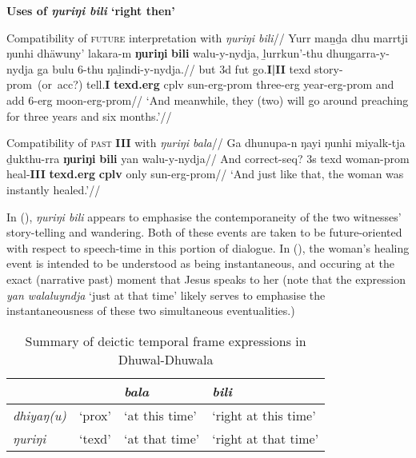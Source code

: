\pex{}\textbf{Uses of \textit{ŋuriŋi bili} `right then'}


\a{}\begingl\glpreamble Compatibility of \textsc{future} interpretation with \textit{ŋuriŋi bili}//
\gla Yurr maṉḏa dhu marrtji ŋunhi dhäwuny' lakara-m \textbf{ŋuriŋi} \textbf{bili} walu-y-nydja, ḻurrkun'-thu dhuŋgarra-y-nydja ga bulu 6-thu ŋaḻindi-y-nydja.//
\glb but 3d \gls{fut} go.\textbf{I|II} \gls{texd} story-\gls{prom}~(or~acc?) tell.\textbf{I} \textbf{\gls{texd}.\gls{erg}} \gls{cplv} sun-\gls{erg}-\gls{prom} three-\gls{erg} year-\gls{erg}-\gls{prom} and \gls{add} 6-\gls{erg} moon-\gls{erg}-\gls{prom}//
\glft`And meanwhile, they (two) will go around preaching for three years and six months.'//\endgl


\a{}\begingl\glpreamble Compatibility of \textsc{past} \textbf{III} with \textit{ŋuriŋi bala}//
\gla Ga dhunupa-n ŋayi ŋunhi miyalk-tja ḏukthu-rra \textbf{ŋuriŋi} \textbf{bili} yan walu-y-nydja//
\glb And correct-\gls{seq}? 3s \gls{texd} woman-\gls{prom} heal-\textbf{III} \textbf{\gls{texd}.\gls{erg}} \textbf{\gls{cplv}} only sun-\gls{erg}-\gls{prom}//
\glft`And just like that, the woman was instantly healed.'//\endgl

\xe



In (), \textit{ŋuriŋi bili} appears to emphasise the contemporaneity of the two witnesses' story-telling and wandering. Both of these events are taken to be future-oriented with respect to speech-time in this portion of dialogue. In (), the woman's healing event is intended to be understood as being instantaneous, and occuring at the exact (narrative past) moment that Jesus speaks to her (note that the expression \textit{yan walaluyndja} `just at that time' likely serves to emphasise the instantaneousness of these two simultaneous eventualities.)



\begin{table}[h]\centering
	\begin{tabular}{lc|ll}
		&&	\textit{bala}	&	\textit{bili}\\\midrule
		\textit{dhiyaŋ(u)} &`\gls{prox}'&	`at this time'&`right at this time'\\
		\textit{ŋuriŋi} & `\gls{texd}'&		`at that time' & `right at that time'\\
	\end{tabular}
	\caption{Summary of deictic temporal frame expressions in Dhuwal-Dhuwala}\label{tempdems}
\end{table}


